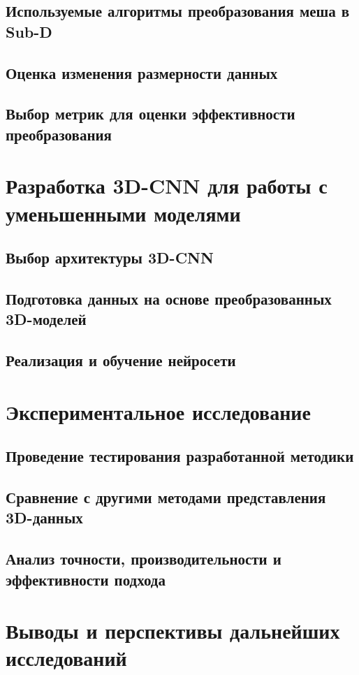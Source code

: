 \documentclass[a4paper,14pt]{extarticle}
\begin{document}
\subsection{Используемые алгоритмы преобразования меша в Sub-D}
\subsection{Оценка изменения размерности данных}
\subsection{Выбор метрик для оценки эффективности преобразования}

\section{Разработка 3D-CNN для работы с уменьшенными моделями}
\subsection{Выбор архитектуры 3D-CNN}
\subsection{Подготовка данных на основе преобразованных 3D-моделей}
\subsection{Реализация и обучение нейросети}

\section{Экспериментальное исследование}
\subsection{Проведение тестирования разработанной методики}
\subsection{Сравнение с другими методами представления 3D-данных}
\subsection{Анализ точности, производительности и эффективности подхода}

\section{Выводы и перспективы дальнейших исследований}
\end{document}
